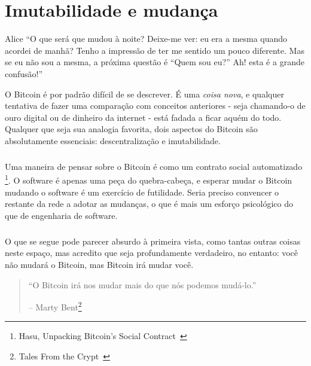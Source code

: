 \chapter{Imutabilidade e mudança}
\label{les:1}

\begin{chapquote}{Alice}
\enquote{O que será que mudou à noite? Deixe-me ver: eu era a mesma quando acordei de manhã? Tenho a impressão de ter me sentido um pouco diferente. Mas se eu não sou a mesma, a próxima questão é “Quem sou eu?” Ah! esta é a grande confusão!}
\end{chapquote}

O Bitcoin é por padrão difícil de se descrever. É uma \textit {coisa nova}, e qualquer tentativa de fazer uma comparação com conceitos anteriores - seja chamando-o de ouro digital ou de dinheiro da internet  - está fadada a ficar aquém do todo. Qualquer que seja sua analogia favorita, dois aspectos do Bitcoin são absolutamente essenciais: descentralização e imutabilidade.

\paragraph{}
Uma maneira de pensar sobre o Bitcoin é como um contrato social automatizado \footnote{Hasu, Unpacking Bitcoin's Social Contract~\cite {social-contract1}}. O software é apenas uma peça do quebra-cabeça, e esperar mudar o Bitcoin mudando o software é um exercício de futilidade. Seria preciso convencer o restante da rede a adotar as mudanças, o que é mais um esforço psicológico do que de engenharia de software.

\paragraph{}
O que se segue pode parecer absurdo à primeira vista, como tantas outras coisas neste espaço, mas acredito que seja profundamente verdadeiro, no entanto: você não mudará o Bitcoin, mas Bitcoin irá mudar você.

\begin{quotation}\begin{samepage}
\enquote{O Bitcoin irá nos mudar mais do que nós podemos mudá-lo.}
\begin{flushright} -- Marty Bent\footnote{Tales From the Crypt~\cite{tftc21}}
\end{flushright}\end{samepage}\end{quotation}


